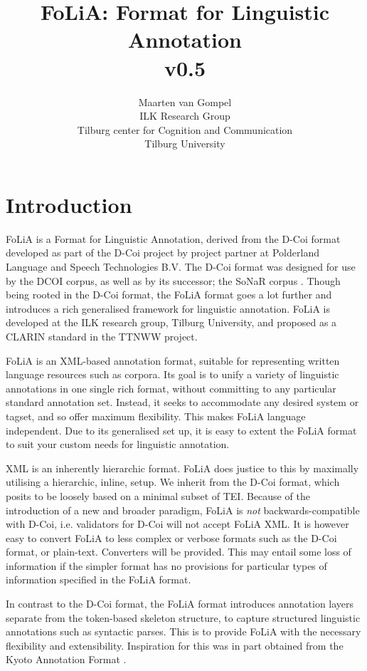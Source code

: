 \documentclass[a4paper,12pt]{report}
\title{FoLiA: Format for Linguistic Annotation \\ \small v0.5}
\author{Maarten van Gompel \\ ILK Research Group \\ Tilburg center for Cognition and Communication \\ Tilburg University }
\begin{document}
\sffamily

\maketitle
\tableofcontents


\chapter{Introduction}

FoLiA is a Format for Linguistic Annotation, derived from the D-Coi format\cite{DCOI} developed as part of the D-Coi project by project partner at Polderland Language and Speech Technologies B.V. The D-Coi format was designed for use by the DCOI corpus, as well as by its successor; the SoNaR corpus \cite{Oostdijk+08}. Though being rooted in the D-Coi format, the FoLiA format goes a lot further and introduces a rich generalised framework for linguistic annotation. FoLiA is developed at the ILK research group, Tilburg University, and proposed as a CLARIN standard in the TTNWW project.

FoLiA is an XML-based\cite{XML} annotation format, suitable for representing written language resources such as corpora. Its goal is to unify a variety of linguistic annotations in one single rich format, without committing to any particular standard annotation set. Instead, it seeks to accommodate any desired system or tagset, and so offer maximum flexibility. This makes FoLiA language independent. Due to its generalised set up, it is easy to extent the FoLiA format to suit your custom needs for linguistic annotation.

XML is an inherently hierarchic format. FoLiA does justice to this by maximally utilising a hierarchic, inline, setup. We inherit from the D-Coi format, which posits to be loosely based on a minimal subset of TEI\cite{TEI}. Because of the introduction of a new and broader paradigm, FoLiA is \emph{not} backwards-compatible with D-Coi, i.e. validators for D-Coi will not accept FoLiA XML. It is however easy to convert FoLiA to less complex or verbose formats such as the D-Coi format, or plain-text. Converters will be provided. This may entail some loss of information if the simpler format has no provisions for particular types of information specified in the FoLiA format. 


In contrast to the D-Coi format, the FoLiA format introduces annotation layers separate from the token-based skeleton structure, to capture structured linguistic annotations such as syntactic parses. This is to provide FoLiA with the necessary flexibility and extensibility. Inspiration for this was in part obtained from the Kyoto Annotation Format \cite{KYOTO}. 
\end{document}
